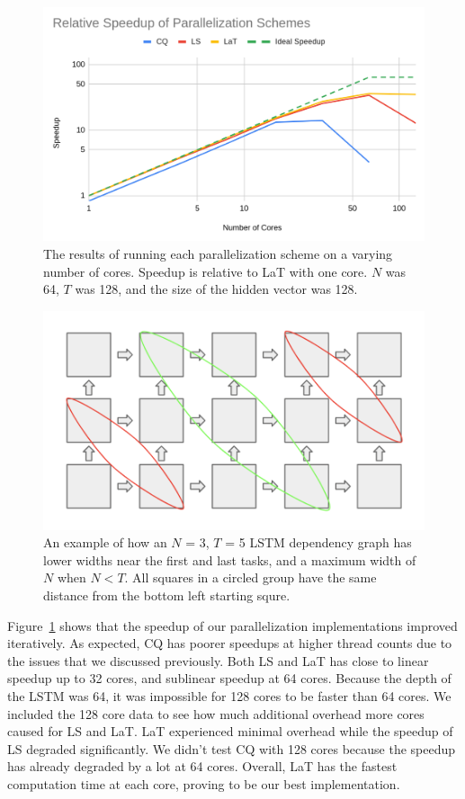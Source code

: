 \documentclass[12pt]{article}
\begin{document}
\begin{figure}
    \centering
    \includegraphics[width=12cm]{speedups.png}
    \caption{The results of running each parallelization scheme on a varying number of cores. Speedup is relative to LaT with one core. $N$ was 64, $T$ was 128, and the size of the hidden vector was 128.}
    \label{fig:scheme_speedups}
\end{figure}

\begin{figure}
    \centering
    \includegraphics[width=12cm]{dependency.png}
    \caption{An example of how an $N$ = 3, $T$ = 5 LSTM dependency graph has lower widths near the first and last tasks, and a maximum width of $N$ when $N < T$. All squares in a circled group have the same distance from the bottom left starting squre.}
    \label{fig:dependency}
\end{figure}

Figure~\ref{fig:scheme_speedups} shows that the speedup of our parallelization implementations improved iteratively.
As expected, CQ has poorer speedups at higher thread counts due to the issues that we discussed previously.
Both LS and LaT has close to linear speedup up to 32 cores, and sublinear speedup at 64 cores.
Because the depth of the LSTM was 64, it was impossible for 128 cores to be faster than 64 cores. 
We included the 128 core data to see how much additional overhead more cores caused for LS and LaT.
LaT experienced minimal overhead while the speedup of LS degraded significantly.
We didn't test CQ with 128 cores because the speedup has already degraded by a lot at 64 cores.
Overall, LaT has the fastest computation time at each core, proving to be our best implementation.
\end{document}
